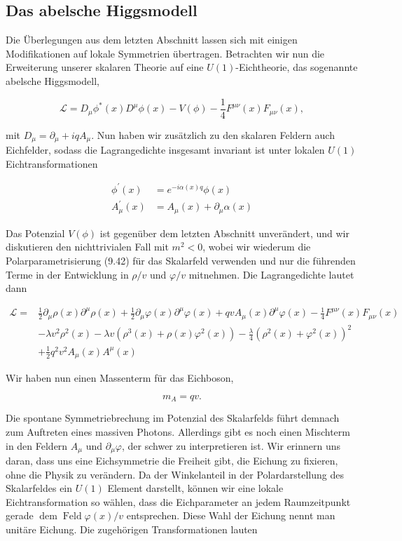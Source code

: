 \documentclass[10pt, letterpaper]{article}
\begin{document}
\subsection*{Das abelsche Higgsmodell}
Die Überlegungen aus dem letzten Abschnitt lassen sich mit einigen Modifikationen auf lokale Symmetrien übertragen. Betrachten wir nun die Erweiterung unserer skalaren Theorie auf eine $U(1)$-Eichtheorie, das sogenannte abelsche Higgsmodell,

$$
\mathscr{L}=D_{\mu} \phi^{*}(x) D^{\mu} \phi(x)-V(\phi)-\frac{1}{4} F^{\mu \nu}(x) F_{\mu \nu}(x),
$$

mit $D_{\mu}=\partial_{\mu}+i q A_{\mu}$. Nun haben wir zusätzlich zu den skalaren Feldern auch Eichfelder, sodass die Lagrangedichte insgesamt invariant ist unter lokalen $U(1)$ Eichtransformationen

$$
\begin{aligned}
\phi^{\prime}(x) & =e^{-i \alpha(x) q} \phi(x) \\
A_{\mu}^{\prime}(x) & =A_{\mu}(x)+\partial_{\mu} \alpha(x)
\end{aligned}
$$

Das Potenzial $V(\phi)$ ist gegenüber dem letzten Abschnitt unverändert, und wir diskutieren den nichttrivialen Fall mit $m^{2}<0$, wobei wir wiederum die Polarparametrisierung (9.42) für das Skalarfeld verwenden und nur die führenden Terme in der Entwicklung in $\rho / v$ und $\varphi / v$ mitnehmen. Die Lagrangedichte lautet dann

$$
\begin{aligned}
\mathscr{L}= & \frac{1}{2} \partial_{\mu} \rho(x) \partial^{\mu} \rho(x)+\frac{1}{2} \partial_{\mu} \varphi(x) \partial^{\mu} \varphi(x)+q v A_{\mu}(x) \partial^{\mu} \varphi(x)-\frac{1}{4} F^{\mu \nu}(x) F_{\mu \nu}(x) \\
& -\lambda v^{2} \rho^{2}(x)-\lambda v\left(\rho^{3}(x)+\rho(x) \varphi^{2}(x)\right)-\frac{\lambda}{4}\left(\rho^{2}(x)+\varphi^{2}(x)\right)^{2} \\
& +\frac{1}{2} q^{2} v^{2} A_{\mu}(x) A^{\mu}(x)
\end{aligned}
$$

Wir haben nun einen Massenterm für das Eichboson,

$$
m_{A}=q v .
$$

Die spontane Symmetriebrechung im Potenzial des Skalarfelds führt demnach zum Auftreten eines massiven Photons. Allerdings gibt es noch einen Mischterm in den Feldern $A_{\mu}$ und $\partial_{\mu} \varphi$, der schwer zu interpretieren ist. Wir erinnern uns daran, dass uns eine Eichsymmetrie die Freiheit gibt, die Eichung zu fixieren, ohne die Physik zu verändern. Da der Winkelanteil in der Polardarstellung des Skalarfeldes ein $U(1)$ Element darstellt, können wir eine lokale Eichtransformation so wählen, dass die Eichparameter an jedem Raumzeitpunkt gerade $\operatorname{dem} \operatorname{Feld} \varphi(x) / v$ entsprechen. Diese Wahl der Eichung nennt man unitäre Eichung. Die zugehörigen Transformationen lauten
\end{document}
